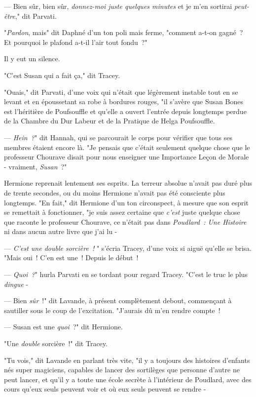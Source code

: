 --- Bien sûr, bien sûr, \emph{donnez-moi juste quelques minutes} et je m'en sortirai \emph{peut-être}," dit Parvati.

"\emph{Pardon}, mais" dit Daphné d'un ton poli mais ferme, "comment a-t-on gagné~? Et pourquoi le plafond a-t-il l'air tout fondu~?"

Il y eut un silence.

"C'est Susan qui a fait ça," dit Tracey.

"Ouais," dit Parvati, d'une voix qui n'était que légèrement instable tout en se levant et en époussetant sa robe à bordures rouges, "il s'avère que Susan Bones est l'héritière de Poufsouffle et qu'elle a ouvert l'entrée depuis longtemps perdue de la Chambre du Dur Labeur et de la Pratique de Helga Poufsouffle.

--- \emph{Hein~?}" dit Hannah, qui se parcourait le corps pour vérifier que tous ses membres étaient encore là. "Je pensais que c'était seulement quelque chose que le professeur Chourave disait pour nous enseigner une Importance Leçon de Morale - vraiment, \emph{Susan}~?"

Hermione reprenait lentement ses esprits. La terreur absolue n'avait pas duré plus de trente secondes, ou du moins Hermione n'avait pas été consciente plus longtemps. "En fait," dit Hermione d'un ton circonspect, à mesure que son esprit se remettait à fonctionner, "je suis assez certaine que \emph{c'est} juste quelque chose que raconte le professeur Chourave, ce n'était pas dans \emph{Poudlard~: Une Histoire} ni dans aucun autre livre que j'ai lu -

--- \emph{C'est une double sorcière~!} " s'écria Tracey, d'une voix si aiguë qu'elle se brisa. "Mais oui~! C'en est une~! Depuis le début~!

--- \emph{Quoi~?}" hurla Parvati en se tordant pour regard Tracey. "C'est le truc le plus \emph{dingue} -

--- Bien \emph{sûr}~!" dit Lavande, à présent complètement debout, commençant à sautiller sous le coup de l'excitation. "J'aurais dû m'en rendre compte~!

--- Susan est une \emph{quoi}~?" dit Hermione.

"Une \emph{double} sorcière~!" dit Tracey.

"Tu vois," dit Lavande en parlant très vite, "il y a toujours des histoires d'enfants nés super magiciens, capables de lancer des sortilèges que personne d'autre ne peut lancer, et qu'il y a toute une école secrète à l'intérieur de Poudlard, avec des cours qu'eux seuls peuvent voir et où eux seuls peuvent se rendre -

